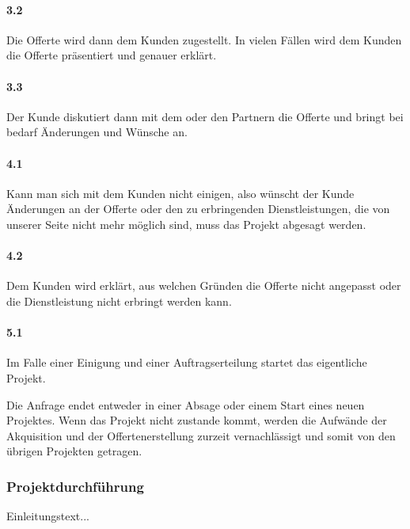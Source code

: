 \paragraph{3.2}
Die Offerte wird dann dem Kunden zugestellt. In vielen Fällen wird dem Kunden
die Offerte präsentiert und genauer erklärt.

\paragraph{3.3}
Der Kunde diskutiert dann mit dem oder den Partnern die Offerte und bringt
bei bedarf Änderungen und Wünsche an.

\paragraph{4.1}
Kann man sich mit dem Kunden nicht einigen, also wünscht der Kunde Änderungen
an der Offerte oder den zu erbringenden Dienstleistungen, die von unserer Seite
nicht mehr möglich sind, muss das Projekt abgesagt werden.

\paragraph{4.2}
Dem Kunden wird erklärt, aus welchen Gründen die Offerte nicht angepasst oder
die Dienstleistung nicht erbringt werden kann.

\paragraph{5.1}
Im Falle einer Einigung und einer Auftragserteilung startet das eigentliche
Projekt.

Die Anfrage endet entweder in einer Absage oder einem Start eines neuen 
Projektes. Wenn das Projekt nicht zustande kommt, werden die Aufwände der
Akquisition und der Offertenerstellung zurzeit vernachlässigt und somit von
den übrigen Projekten getragen.

\subsubsection{Projektdurchführung}
Einleitungstext...

